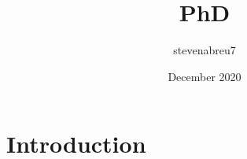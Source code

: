 \documentclass{article}
\title{PhD}
\author{stevenabreu7}
\date{December 2020}
\begin{document}
\maketitle

\section{Introduction}
\end{document}
